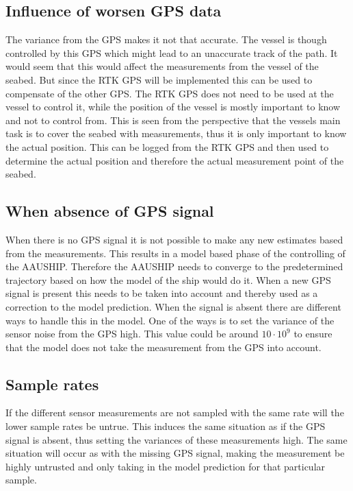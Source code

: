 \subsection{Influence of worsen \ac{GPS} data}
The variance from the \ac{GPS} makes it not that accurate. The vessel is though controlled by this \ac{GPS} which might lead to an unaccurate track of the path. It would seem that this would affect the measurements from the vessel of the seabed. But since the \ac{RTK} \ac{GPS} will be implemented this can be used to compensate of the other \ac{GPS}. The \ac{RTK} \ac{GPS} does not need to be used at the vessel to control it, while the position of the vessel is mostly important to know and not to control from. This is seen from the perspective that the vessels main task is to cover the seabed with measurements, thus it is only important to know the actual position. This can be logged from the \ac{RTK} \ac{GPS} and then used to determine the actual position and therefore the actual measurement point of the seabed.

\subsection{When absence of \ac{GPS} signal}
When there is no \ac{GPS} signal it is not possible to make any new estimates based from the measurements. This results in a model based phase of the controlling of the AAUSHIP. Therefore the AAUSHIP needs to converge to the predetermined trajectory based on how the model of the ship would do it. When a new \ac{GPS} signal is present this needs to be taken into account and thereby used as a correction to the model prediction. When the signal is absent there are different ways to handle this in the model. One of the ways is to set the variance of the sensor noise from the \ac{GPS} high. This value could be around $10 \cdot 10^9$ to ensure that the model does not take the measurement from the \ac{GPS} into account.

\subsection{Sample rates}
If the different sensor measurements are not sampled with the same rate will the lower sample rates be untrue. This induces the same situation as if the \ac{GPS} signal is absent, thus setting the variances of these measurements high. The same situation will occur as with the missing \ac{GPS} signal, making the measurement be highly untrusted and only taking in the model prediction for that particular sample.

